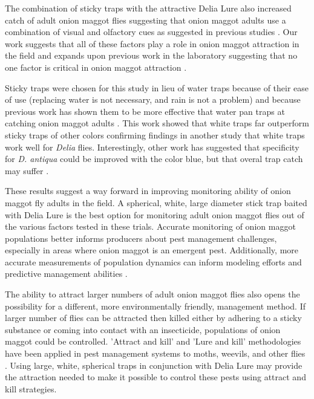 \documentclass[alpha-refs]{wiley-article}
\begin{document}
The combination of sticky traps with the attractive Delia Lure also increased catch of adult onion maggot flies suggesting that onion maggot adults use a combination of visual and olfactory cues as suggested in previous studies \citep{harris1983color, harris1988host}.  Our work suggests that all of these factors play a role in onion maggot attraction in the field and expands upon previous work in the laboratory suggesting that no one factor is critical in onion maggot attraction \citep{harris1988host}.  

Sticky traps were chosen for this study in lieu of water traps because of their ease of use (replacing water is not necessary, and rain is not a problem) and because previous work has shown them to be more effective that water pan traps at catching onion maggot adults \citep{thomingdeveloping}.  This work showed that white traps far outperform sticky traps of other colors confirming findings in another study that white traps work well for \textit{Delia} flies.  Interestingly, other work has suggested that specificity for \textit{D. antiqua} could be improved with the color blue, but that overal trap catch may suffer \citep{thomingdeveloping}.   

These results suggest a way forward in improving monitoring ability of onion maggot fly adults in the field.  A spherical, white, large diameter stick trap baited with Delia Lure is the best option for monitoring adult onion maggot flies out of the various factors tested in these trials.  Accurate monitoring of onion maggot populations better informs producers about pest management challenges, especially in areas where onion maggot is an emergent pest.  Additionally, more accurate measurements of population dynamics can inform modeling efforts and predictive management abilities \cite{ning2017predicting, otto2000development,thomingdeveloping}.    

The ability to attract larger numbers of adult onion maggot flies also opens the possibility for a different, more environmentally friendly, management method.  If larger number of flies can be attracted then killed either by adhering to a sticky substance or coming into contact with an insecticide, populations of onion maggot could be controlled.  'Attract and kill' and 'Lure and kill' methodologies have been applied in pest management systems to moths, weevils, and other flies \citep{el2009potential,el2011bait,navarro2013efficacy,charmillot2000attract}.  Using large, white, spherical traps in conjunction with Delia Lure may provide the attraction needed to make it possible to control these pests using attract and kill strategies.  
\end{document}
